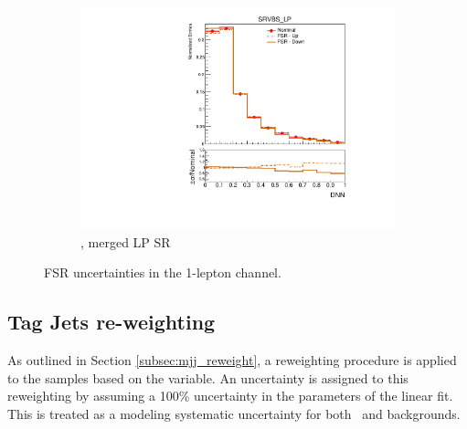 \begin{figure}[htp]
\begin{subfigure}[b]{0.3\textwidth}
        \includegraphics[width=\textwidth]{figures/1lep/PDFUnc/FSR/ttbar_0ptag1pfat0pjet_0ptv_SRVBS_LP_DNN_SysTheoryFSR_Top__1up_Norm.pdf}
        \caption{\ttbar, merged LP SR}
    \end{subfigure}
    \caption{FSR uncertainties in the 1-lepton channel.}
    \label{fig:fsrUnc1Lep}
\end{figure}

\subsection{Tag Jets re-weighting}
\label{subsec:bkg_uncer_mjjrew}

As outlined in Section \ref{subsec:mjj_reweight}, a reweighting procedure is applied to the \Vjets samples based on the \mjjtag variable. 
An uncertainty is assigned to this reweighting by assuming a 100\% uncertainty in the parameters of the linear fit. 
This is treated as a modeling systematic uncertainty for both \Wjets\ and \Zjets backgrounds.


